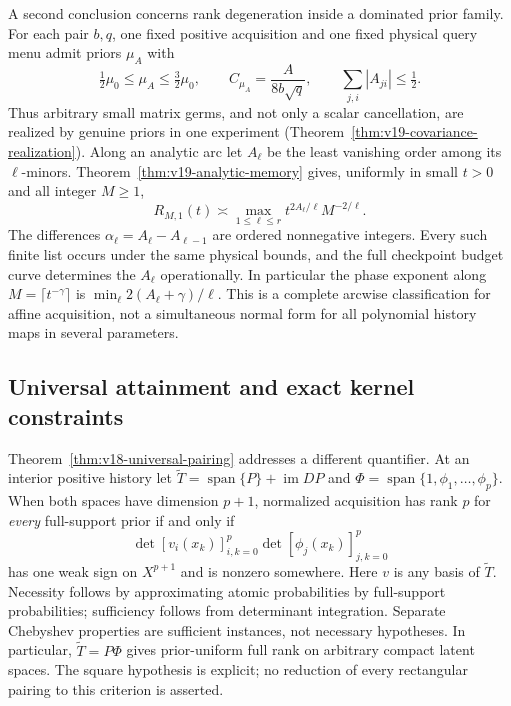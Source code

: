 \documentclass[11pt]{amsart}
\theoremstyle{definition}\newtheorem{definition}[theorem]{Definition}
\theoremstyle{remark}\newtheorem{remark}[theorem]{Remark}
\begin{document}
A second conclusion concerns rank degeneration inside a dominated
prior family. For each pair $b,q$, one fixed positive acquisition and
one fixed physical query menu admit priors $\mu_A$ with
\[
 \tfrac12\mu_0\le\mu_A\le\tfrac32\mu_0,\qquad
 C_{\mu_A}=\frac{A}{8b\sqrt q},\qquad
 \sum_{j,i}|A_{ji}|\le\tfrac12.
\]
Thus arbitrary small matrix germs, and not only a scalar cancellation,
are realized by genuine priors in one experiment
(Theorem~\ref{thm:v19-covariance-realization}). Along an analytic
arc let $A_\ell$ be the least vanishing order among its $\ell$-minors.
Theorem~\ref{thm:v19-analytic-memory} gives, uniformly in small
$t>0$ and all integer $M\ge1$,
\[
 R_{M,1}(t)\asymp
     \max_{1\le\ell\le r}t^{2A_\ell/\ell}M^{-2/\ell}.
\]
The differences $\alpha_\ell=A_\ell-A_{\ell-1}$ are ordered
nonnegative integers. Every such finite list occurs under the same
physical bounds, and the full checkpoint budget curve determines the
$A_\ell$ operationally. In particular the phase exponent along
$M=\lceil t^{-\gamma}\rceil$ is
$\min_\ell 2(A_\ell+\gamma)/\ell$. This is a complete arcwise
classification for affine acquisition, not a simultaneous normal form
for all polynomial history maps in several parameters.

\subsection{Universal attainment and exact kernel constraints}
Theorem~\ref{thm:v18-universal-pairing} addresses a different
quantifier. At an interior positive history let
$\widetilde T=\operatorname{span}\{P\}+\operatorname{im}DP$ and
$\Phi=\operatorname{span}\{1,\phi_1,\ldots,\phi_p\}$. When both
spaces have dimension $p+1$, normalized acquisition has rank $p$ for
\emph{every} full-support prior if and only if
\[
 \det[v_i(x_k)]_{i,k=0}^p\det[\phi_j(x_k)]_{j,k=0}^p
\]
has one weak sign on $X^{p+1}$ and is nonzero somewhere. Here $v$ is
any basis of $\widetilde T$. Necessity follows by approximating atomic
probabilities by full-support probabilities; sufficiency follows from
determinant integration. Separate Chebyshev properties are sufficient
instances, not necessary hypotheses. In particular,
$\widetilde T=P\Phi$ gives prior-uniform full rank on arbitrary compact
latent spaces. The square hypothesis is explicit; no reduction of every
rectangular pairing to this criterion is asserted.
\end{document}
